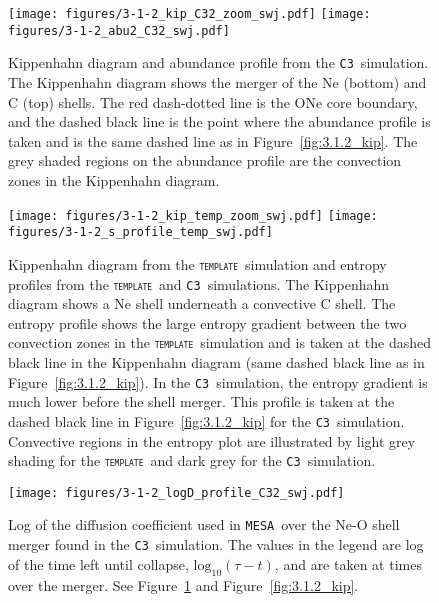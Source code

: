 \documentclass[useAMS,usenatbib]{mn2e}
\newcommand{\mesa}{\texttt{MESA}}
\newcommand{\template}{\textsc{\texttt{template}}}
\newcommand{\Cc}{\textsc{\texttt{C3}}}
\begin{document}
\begin{figure}
	\texttt{[image: figures/3-1-2\_kip\_C32\_zoom\_swj.pdf]}
	\texttt{[image: figures/3-1-2\_abu2\_C32\_swj.pdf]}
	\caption{
		Kippenhahn diagram and abundance profile from the \Cc\ simulation. 
		The Kippenhahn diagram shows the merger of the Ne (bottom) and 
		C (top) shells. The red dash-dotted line is the ONe core boundary, 
		and the dashed black line is the point where the abundance profile is 
		taken and is the same dashed line as in Figure~\ref{fig:3.1.2_kip}. The 
		grey shaded regions on the abundance profile are the convection 
		zones in the Kippenhahn diagram.
	}
	\label{fig:3.1.2_kip_abu_C32} %
\end{figure}

\begin{figure}
	\texttt{[image: figures/3-1-2\_kip\_temp\_zoom\_swj.pdf]}
	\texttt{[image: figures/3-1-2\_s\_profile\_temp\_swj.pdf]}
	\caption{
		Kippenhahn diagram from the \template~simulation and entropy 
		profiles from the \template~and \Cc~simulations. The Kippenhahn 
		diagram shows a Ne shell underneath a convective C shell. The 
		entropy profile shows the large entropy gradient between the two
		convection zones in the \template~simulation and is taken at the 
		dashed black line in the Kippenhahn diagram (same dashed black 
		line as in Figure~\ref{fig:3.1.2_kip}). In the \Cc\ simulation, 
		the entropy gradient is much lower before the shell merger. This 
		profile is taken at the dashed black line in Figure~\ref{fig:3.1.2_kip} 
		for the \Cc\ simulation. Convective regions in the entropy plot are 
		illustrated by light grey shading for the \template\ and dark grey 
		for the \Cc\ simulation.
	}
	\label{fig:3.1.2_kip_s} %
\end{figure}

\begin{figure}
	\texttt{[image: figures/3-1-2\_logD\_profile\_C32\_swj.pdf]}
	\caption{
		Log of the diffusion coefficient used in \mesa~over the Ne-O shell 
		merger found in the \Cc\ simulation. The values in the legend are 
		log of the time left until collapse, $\mathrm{log}_{10}(\tau - t)$, and 
		are taken at times over the merger. See 
		Figure~\ref{fig:3.1.2_kip_abu_C32} and Figure~\ref{fig:3.1.2_kip}.
	}
	\label{fig:3.1.2_logD} %
\end{figure}
\end{document}
